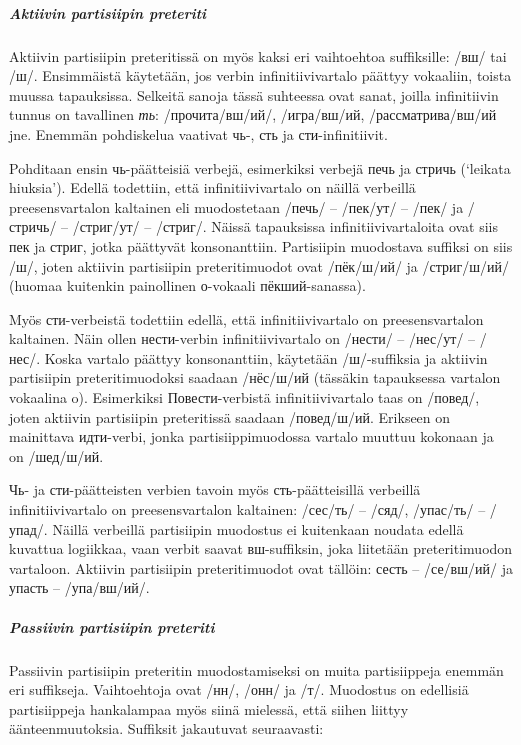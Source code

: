 \documentclass[]{scrartcl}
\begin{document}
\subparagraph{Aktiivin partisiipin
preteriti}\label{aktiivin-partisiipin-preteriti}

Aktiivin partisiipin preteritissä on myös kaksi eri vaihtoehtoa
suffiksille: /вш/ tai /ш/. Ensimmäistä käytetään, jos verbin
infinitiivivartalo päättyy vokaaliin, toista muussa tapauksissa.
Selkeitä sanoja tässä suhteessa ovat sanat, joilla infinitiivin tunnus
on tavallinen \emph{ть}: /прочита/вш/ий/, /игра/вш/ий,
/рассматрива/вш/ий jne. Enemmän pohdiskelua vaativat чь-, сть ja
сти-infinitiivit.

Pohditaan ensin чь-päätteisiä verbejä, esimerkiksi verbejä печь ja
стричь (`leikata hiuksia'). Edellä todettiin, että infinitiivivartalo on
näillä verbeillä preesensvartalon kaltainen eli muodostetaan /печь/ --
/пек/ут/ -- /пек/ ja /стричь/ -- /стриг/ут/ -- /стриг/. Näissä
tapauksissa infinitiivivartaloita ovat siis пек ja стриг, jotka
päättyvät konsonanttiin. Partisiipin muodostava suffiksi on siis /ш/,
joten aktiivin partisiipin preteritimuodot ovat /пёк/ш/ий/ ja
/стриг/ш/ий/ (huomaa kuitenkin painollinen о-vokaali пёкший-sanassa).

Myös сти-verbeistä todettiin edellä, että infinitiivivartalo on
preesensvartalon kaltainen. Näin ollen нести-verbin infinitiivivartalo
on /нести/ -- /нес/ут/ -- /нес/. Koska vartalo päättyy konsonanttiin,
käytetään /ш/-suffiksia ja aktiivin partisiipin preteritimuodoksi
saadaan /нёс/ш/ий (tässäkin tapauksessa vartalon vokaalina o).
Esimerkiksi Повести-verbistä infinitiivivartalo taas on /повед/, joten
aktiivin partisiipin preteritissä saadaan /повед/ш/ий. Erikseen on
mainittava идти-verbi, jonka partisiippimuodossa vartalo muuttuu
kokonaan ja on /шед/ш/ий.

Чь- ja сти-päätteisten verbien tavoin myös сть-päätteisillä verbeillä
infinitiivivartalo on preesensvartalon kaltainen: /сес/ть/ -- /сяд/,
/упас/ть/ -- /упад/. Näillä verbeillä partisiipin muodostus ei
kuitenkaan noudata edellä kuvattua logiikkaa, vaan verbit saavat
вш-suffiksin, joka liitetään preteritimuodon vartaloon. Aktiivin
partisiipin preteritimuodot ovat tällöin: сесть -- /се/вш/ий/ ja упасть
-- /упа/вш/ий/.

\subparagraph{Passiivin partisiipin
preteriti}\label{passiivin-partisiipin-preteriti}

Passiivin partisiipin preteritin muodostamiseksi on muita partisiippeja
enemmän eri suffikseja. Vaihtoehtoja ovat /нн/, /онн/ ja /т/. Muodostus
on edellisiä partisiippeja hankalampaa myös siinä mielessä, että siihen
liittyy äänteenmuutoksia. Suffiksit jakautuvat seuraavasti:
\end{document}
